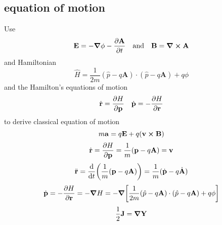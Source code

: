 \documentclass[12pt]{article}
\begin{document}
\subsection*{equation of motion}
Use \[\vb{E}=-\grad{\phi}-\pdv{\vb{A}}{t}\qq{and}\vb{B}=\curl{\vb{A}}\]
and Hamiltonian \[\hat{H}=\frac{1}{2m}(\hat{p}-q\mathbf{A})\cdot(\hat{p}-q\mathbf{A})+ q\phi\]
and the Hamilton's equations of motion \[\dot{\vb{r}}=\pdv{H}{\vb{p}}\quad\dot{\vb{p}}=-\pdv{H}{\vb{r}}\]
to derive classical equation of motion \[m\vb{a}=q\vb{E}+q(\vb{v}\cp\vb{B})\]
\[\dot{\vb{r}}=\pdv{H}{\vb{p}}=\frac{1}{m}(\vb{p}-q\vb{A})=\vb{v}\]
\[\ddot{\vb{r}}=\dv{t}\qty(\frac{1}{m}(\vb{p}-q\vb{A}))=\frac{1}{m}(\dot{\vb{p}}-q\dot{\vb{A}})\]
\[\dot{\vb{p}}=-\pdv{H}{\vb{r}}=-\grad{H}=-\grad{\qty[\frac{1}{2m}(\hat{p}-q\mathbf{A})\cdot(\hat{p}-q\mathbf{A})+ q\phi]}\]
\begin{align*}
\frac{1}{2}
\vb{J}=\grad{\vb{Y}}
\end{align*}
\end{document}
